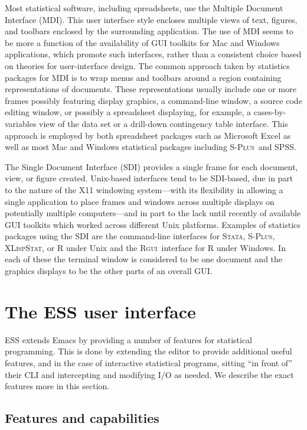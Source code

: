 \documentclass{article}
\newcommand*{\Splus}{\textsc{S-Plus}}
\newcommand*{\XLispStat}{\textsc{XLispStat}}
\newcommand*{\Stata}{\textsc{Stata}}
\newcommand*{\Rgui}{\textsc{Rgui}}
\begin{document}
Most statistical software, including spreadsheets, use the Multiple
Document Interface (MDI).  This user interface style encloses multiple
views of text, figures, and toolbars enclosed by the surrounding
application.  The use of MDI seems to be more a function of the
availability of GUI toolkits for Mac and Windows applications, which
promote such interfaces, rather than a consistent choice based on
theories for user-interface design.  The common approach taken by
statistics packages for MDI is to wrap menus and toolbars around a
region containing representations of documents.  These representations
usually include one or more frames possibly featuring display
graphics, a command-line window, a source code editing window, or
possibly a spreadsheet displaying, for example, a cases-by-variables
view of the data set or a drill-down contingency table interface.
This approach is employed by both spreadsheet packages such as
Microsoft Excel as well as most Mac and Windows statistical packages
including \Splus\ and SPSS.

The Single Document Interface (SDI) provides a single frame for each
document, view, or figure created.  Unix-based interfaces tend to be
SDI-based, due in part to the nature of the X11 windowing system---with its
flexibility in allowing a single application to place frames and
windows across multiple displays on potentially multiple computers---and
in part to the lack until recently of available GUI toolkits which
worked across different Unix platforms.  Examples of statistics
packages using the SDI are the command-line interfaces for \Stata,
\Splus, \XLispStat, or R under Unix and the \Rgui\ interface for R
under Windows.  In each of these the terminal window is considered to
be one document and the graphics displays to be the other parts of an
overall GUI.


\section{The ESS user interface}
\label{sec:ESS}

ESS extends Emacs by providing a number of features for statistical
programming.  This is done by extending the editor to provide
additional useful features, and in the case of interactive statistical
programs, sitting ``in front of'' their CLI and intercepting and
modifying I/O as needed.  We describe the exact features more in this
section.

\subsection{Features and capabilities}
\label{sec:ESS:features}
\end{document}

